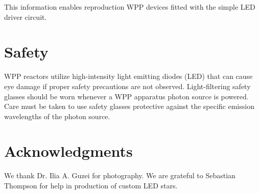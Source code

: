 \documentclass[11pt]{article}
\let\stdsection\section
\renewcommand\section{\clearpage\stdsection}
\begin{document}
This information enables reproduction WPP devices fitted with the simple LED driver circuit.

\section{Safety}

WPP reactors utilize high-intensity light emitting diodes (LED) that can cause eye damage if proper safety precautions are not observed.
Light-filtering safety glasses should be worn whenever a WPP apparatus photon source is powered.
Care must be taken to use safety glasses protective against the specific emission wavelengths of the photon source.

\section{Acknowledgments}

We thank Dr. Ilia A. Guzei for photography. We are grateful to Sebastian Thompson for help in production of custom LED stars. 
\end{document}
